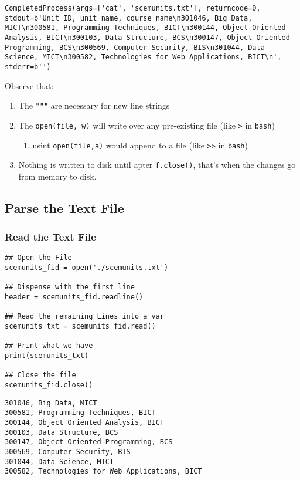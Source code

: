\documentclass[11pt]{article}
\begin{document}
\begin{verbatim}
CompletedProcess(args=['cat', 'scemunits.txt'], returncode=0, stdout=b'Unit ID, unit name, course name\n301046, Big Data, MICT\n300581, Programming Techniques, BICT\n300144, Object Oriented Analysis, BICT\n300103, Data Structure, BCS\n300147, Object Oriented Programming, BCS\n300569, Computer Security, BIS\n301044, Data Science, MICT\n300582, Technologies for Web Applications, BICT\n', stderr=b'')
\end{verbatim}



Observe that:

\begin{enumerate}
\item The \texttt{"""} are necessary for new line strings
\item The \texttt{open(file, w)} will write over any pre-existing file (like \texttt{>} in \texttt{bash})
\begin{enumerate}
\item usint \texttt{open(file,a)} would append to a file (like \texttt{>>} in \texttt{bash})
\end{enumerate}
\item Nothing is written to disk until apter \texttt{f.close()}, that's when the changes go from memory to disk.
\end{enumerate}

\subsection{Parse the Text File}
\label{sec:orgc585340}
\subsubsection{Read the Text File}
\label{sec:orge5a1a9f}

\begin{verbatim}
## Open the File
scemunits_fid = open('./scemunits.txt')

## Dispense with the first line
header = scemunits_fid.readline()

## Read the remaining Lines into a var
scemunits_txt = scemunits_fid.read()

## Print what we have
print(scemunits_txt)

## Close the file
scemunits_fid.close()
\end{verbatim}



\begin{verbatim}
301046, Big Data, MICT
300581, Programming Techniques, BICT
300144, Object Oriented Analysis, BICT
300103, Data Structure, BCS
300147, Object Oriented Programming, BCS
300569, Computer Security, BIS
301044, Data Science, MICT
300582, Technologies for Web Applications, BICT
\end{verbatim}
\end{document}
